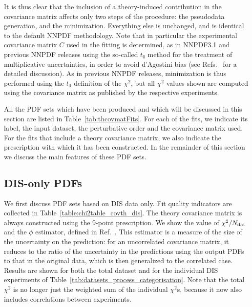 It is thus clear that the inclusion of a theory-induced contribution
in the covariance matrix affects only two steps of the procedure: the
pseudodata generation, and the minimization. Everything else is
unchanged, and is identical to the default NNPDF methodology.
%
Note
that in particular the experimental covariance matrix $C$ used in 
the fitting is determined, as in NNPDF3.1 and previous NNPDF releases using the
so-called $t_0$ method for the treatment of multiplicative
uncertainties, in order to 
avoid d'Agostini bias (see Refs.~\cite{Ball:2009qv,Ball:2012wy} for a
detailed discussion).
%
As in previous NNPDF releases, minimization is thus
performed using the $t_0$ definition of the $\chi^2$, but all $\chi^2$
values shown are computed using the covariance matrix as published by
the respective experiments.

All the PDF sets which have been produced and which will be discussed in this
section are listed in Table~\ref{tab:thcovmatFits}.
%
For each of the fits, 
we indicate its label, the input dataset,
   the  perturbative order and the covariance matrix used.
   For the fits that include a theory covariance matrix, we also indicate the prescription
   with which it has been constructed. 
   In the remainder of this section we discuss the main features
   of these PDF sets.
  


\subsection{DIS-only PDFs}

We first discuss PDF sets based on DIS data only.
Fit quality indicators are collected in
Table~\ref{table:chi2table_covth_dis}. The theory covariance matrix is always
constructed using the 9-point prescription. 
We show the value of 
$\chi^2/N_{\rm dat}$ and the $\phi$ estimator, defined
in Ref.~\cite{Ball:2014uwa}. This estimator is a measure of the size of the
uncertainty on the prediction: for an uncorrelated covariance
matrix, it reduces to  the 
ratio of the uncertainty in the predictions using
the output PDFs to that in the original data, which is then
generalized to the correlated case. Results are shown
for both the total dataset and for the  individual DIS experiments of Table~\ref{tab:datasets_process_categorisation}.
%
Note that the total $\chi^2$ is no longer
just the weighted sum of the individual $\chi^2$s, because it now also includes
correlations between experiments.

